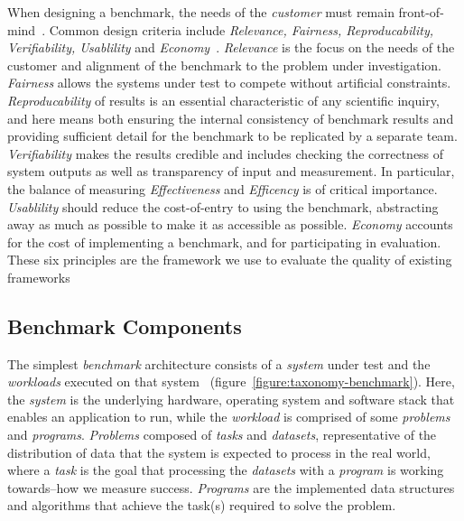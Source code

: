When designing a benchmark, the needs of the \textit{customer} must remain front-of-mind~\cite{Carpinetti2002}.
Common design criteria include \textit{Relevance, Fairness, Reproducability, Verifiability, Usablility} and \textit{Economy}~\cite{Huppler2009, Kistowski2015}.
\textit{Relevance} is the focus on the needs of the customer and alignment of the benchmark to the problem under investigation. 
\textit{Fairness} allows the systems under test to compete without artificial constraints. 
\textit{Reproducability} of results is an essential characteristic of any scientific inquiry, and here means both ensuring the internal consistency of benchmark results and providing sufficient detail for the benchmark to be replicated by a separate team. 
\textit{Verifiability} makes the results credible and includes checking the correctness of system outputs as well as transparency of input and measurement.
In particular, the balance of measuring \textit{Effectiveness} and \textit{Efficency} is of critical importance. 
\textit{Usablility} should reduce the cost-of-entry to using the benchmark, abstracting away as much as possible to make it as accessible as possible. 
\textit{Economy} accounts for the cost of implementing a benchmark, and for participating in evaluation. 
These six principles are the framework we use to evaluate the quality of existing frameworks

\subsection{Benchmark Components}


The simplest \textit{benchmark} architecture consists of a \textit{system} under test and the \textit{workloads} executed on that system~\cite{Hennessy2019} (figure~\ref{figure:taxonomy-benchmark}).
Here, the \textit{system} is the underlying hardware, operating system and software stack that enables an application to run, while the \textit{workload} is comprised of some \textit{problems} and \textit{programs}.
\textit{Problems} composed of \textit{tasks} and  \textit{datasets}, representative of the distribution of data that the system is expected to process in the real world, where a \textit{task} is the goal that processing the \textit{datasets} with a \textit{program} is working towards--how we measure success.
\textit{Programs} are the implemented data structures and algorithms that achieve the task(s) required to solve the problem.


